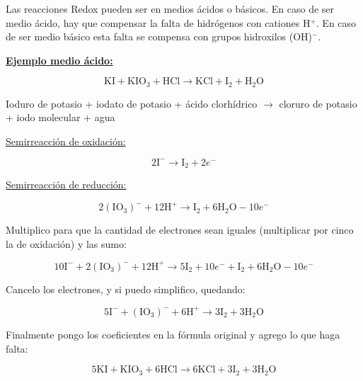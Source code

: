 Las reacciones Redox pueden ser en medios ácidos o básicos. En caso de ser medio ácido, hay que compensar la falta de hidrógenos con cationes H$^+$. En caso de ser medio básico esta falta se compensa con grupos hidroxilos (OH)$^-$.

\skipline
\textbf{\underline{Ejemplo medio ácido:}}

$$\text{KI} + \text{K} \text{I} \text{O}_3 + \text{H} \text{Cl} \longrightarrow
\text{KCl} + \text{I}_2 +  \text{H}_2 \text{O}$$

\hfil Ioduro de potasio \hfil + \hfil iodato de potasio \hfil + \hfil ácido clorhídrico \hfil
$\rightarrow$ \hfil
cloruro de potasio \hfil + \hfil iodo molecular \hfil + \hfil agua \hfil 

\begin{multicols}{2}

\underline{Semirreacción de oxidación:}

$$2\text{I}^{-} \longrightarrow \text{I}_2 + 2e^-$$

\underline{Semirreacción de reducción:}

$$2(\text{IO}_3)^{-} + 12 \text{H}^+ \longrightarrow \text{I}_2 + 6\text{H}_2 \text{O} - 10e^-$$
\end{multicols}

Multiplico para que la cantidad de electrones sean iguales (multiplicar por cinco la de oxidación) y las sumo:

$$10\text{I}^{-} + 2(\text{IO}_3)^{-} + 12 \text{H}^+ \longrightarrow 5 \text{I}_2 + 10 e^- + \text{I}_2 + 6\text{H}_2 \text{O} - 10e^-$$

Cancelo los electrones, y si puedo simplifico, quedando:

$$5\text{I}^{-} + (\text{IO}_3)^{-} + 6 \text{H}^+ \longrightarrow 3 \text{I}_2 + 3\text{H}_2 \text{O}$$

Finalmente pongo los coeficientes en la fórmula original y agrego lo que haga falta:

$$5\text{KI} + \text{K} \text{I} \text{O}_3 + 6\text{H} \text{Cl} \longrightarrow
6\text{KCl} + 3\text{I}_2 +  3\text{H}_2 \text{O}$$
